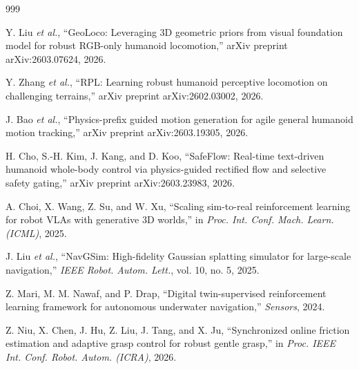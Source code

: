 \documentclass[11pt,a4paper]{article}
\begin{document}
\begin{thebibliography}{999}

Y. Liu \textit{et al.}, ``{GeoLoco}: Leveraging 3D geometric priors from visual foundation model for robust {RGB}-only humanoid locomotion,'' arXiv preprint arXiv:2603.07624, 2026.




Y. Zhang \textit{et al.}, ``{RPL}: Learning robust humanoid perceptive locomotion on challenging terrains,'' arXiv preprint arXiv:2602.03002, 2026.




J. Bao \textit{et al.}, ``Physics-prefix guided motion generation for agile general humanoid motion tracking,'' arXiv preprint arXiv:2603.19305, 2026.




H. Cho, S.-H. Kim, J. Kang, and D. Koo, ``{SafeFlow}: Real-time text-driven humanoid whole-body control via physics-guided rectified flow and selective safety gating,'' arXiv preprint arXiv:2603.23983, 2026.




A. Choi, X. Wang, Z. Su, and W. Xu, ``Scaling sim-to-real reinforcement learning for robot VLAs with generative 3D worlds,'' in \textit{Proc. Int. Conf. Mach. Learn. (ICML)}, 2025.




J. Liu \textit{et al.}, ``{NavGSim}: High-fidelity Gaussian splatting simulator for large-scale navigation,'' \textit{IEEE Robot. Autom. Lett.}, vol. 10, no. 5, 2025.




Z. Mari, M. M. Nawaf, and P. Drap, ``Digital twin-supervised reinforcement learning framework for autonomous underwater navigation,'' \textit{Sensors}, 2024.




Z. Niu, X. Chen, J. Hu, Z. Liu, J. Tang, and X. Ju, ``Synchronized online friction estimation and adaptive grasp control for robust gentle grasp,'' in \textit{Proc. IEEE Int. Conf. Robot. Autom. (ICRA)}, 2026.




\end{thebibliography}
\end{document}
